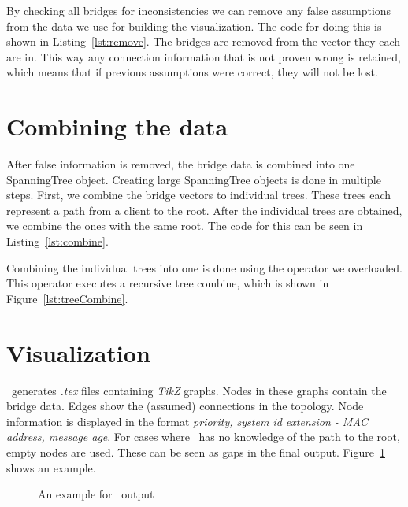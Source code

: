 By checking all bridges for inconsistencies we can remove any false assumptions from the data we use for building the visualization.
The code for doing this is shown in Listing~\ref{lst:remove}.
The bridges are removed from the vector they each are in.
This way any connection information that is not proven wrong is retained, which means that if previous assumptions were correct, they will not be lost.
\section{Combining the data}
\label{combining_data}
After false information is removed, the bridge data is combined into one SpanningTree object.
Creating large SpanningTree objects is done in multiple steps.
First, we combine the bridge vectors to individual trees.
These trees each represent a path from a client to the root.
After the individual trees are obtained, we combine the ones with the same root.
The code for this can be seen in Listing~\ref{lst:combine}.

Combining the individual trees into one is done using the operator we overloaded.
This operator executes a recursive tree combine, which is shown in Figure~\ref{lst:treeCombine}.


\section{Visualization}
\tool\ generates \textit{.tex} files containing \textit{TikZ} graphs.
Nodes in these graphs contain the bridge data.
Edges show the (assumed) connections in the topology.
Node information is displayed in the format \textit{priority, system id extension - MAC address, message age}.
For cases where \tool\ has no knowledge of the path to the root, empty nodes are used.
These can be seen as gaps in the final output.
Figure~\ref{fig:viz_example} shows an example.
\begin{figure}[h]
    \centering
    \caption{An example for \tool\ output}
    \label{fig:viz_example}
\end{figure}

